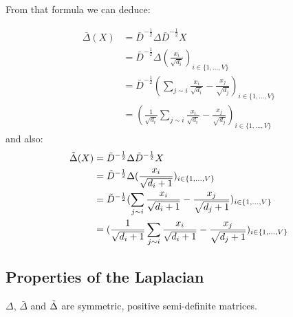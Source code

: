 \documentclass[12pt]{article}
\begin{document}
From that formula we can deduce:

\begin{align*}
    \bar{\Delta}(X) &= \bar{D}^{-\frac{1}{2}} \Delta \bar{D}^{-\frac{1}{2}} X \\
    &= \bar{D}^{-\frac{1}{2}} \Delta (\frac{x_i}{\sqrt{d_i}})_{i \in \{1,...,V\}} \\
    &= \bar{D}^{-\frac{1}{2}} (\sum_{j \sim i} \frac{x_i}{\sqrt{d_i}} - \frac{x_j}{\sqrt{d_j}})_{i \in \{1,...,V\}} \\
    &= (\frac{1}{\sqrt{d_i}} \sum_{j \sim i} \frac{x_i}{\sqrt{d_i}} - \frac{x_j}{\sqrt{d_j}})_{i \in \{1,...,V\}}
\end{align*}
and also:
\begin{align*}
    \Tilde{\Delta}(X) &= \Tilde{D}^{-\frac{1}{2}} \Delta \Tilde{D}^{-\frac{1}{2}} X \\
    &= \Tilde{D}^{-\frac{1}{2}} \Delta (\frac{x_i}{\sqrt{d_i +1}})_{i \in \{1,...,V\}} \\
    &= \Tilde{D}^{-\frac{1}{2}} (\sum_{j \sim i} \frac{x_i}{\sqrt{d_i +1}} - \frac{x_j}{\sqrt{d_j +1}})_{i \in \{1,...,V\}} \\
    &= (\frac{1}{\sqrt{d_i +1}} \sum_{j \sim i} \frac{x_i}{\sqrt{d_i +1}} - \frac{x_j}{\sqrt{d_j +1}})_{i \in \{1,...,V\}}
\end{align*}


\subsection{Properties of the Laplacian}
\begin{thm}\label{thm:laplacian}
    $\Delta$, $\bar{\Delta}$ and $\Tilde{\Delta}$ are symmetric, positive semi-definite matrices.
\end{thm}
\end{document}
